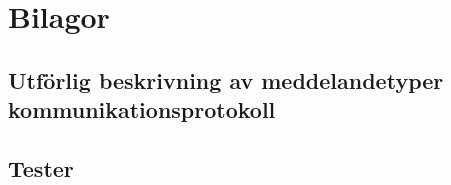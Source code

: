 \documentclass{article}
\begin{document}




\section{Bilagor}
    \subsection{Utförlig beskrivning av meddelandetyper kommunikationsprotokoll}
    \label{bilaga:protokoll}
        
        
	\clearpage
	\subsection{Tester}
    		\label{bilaga:tester}
     	
         
         
\end{document}
